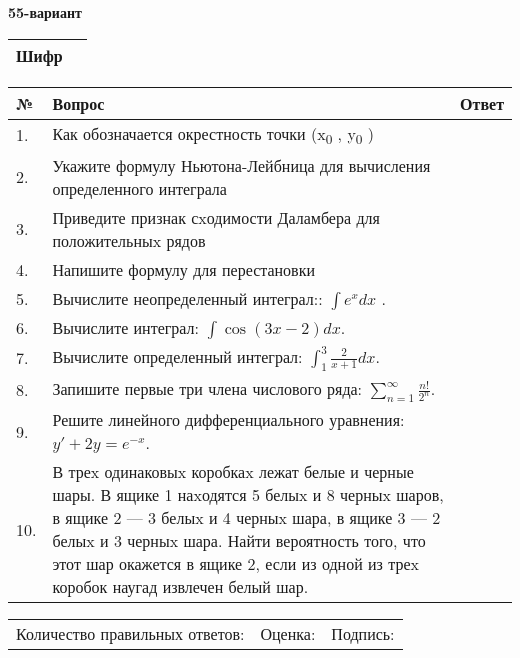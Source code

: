\documentclass{article}
\begin{document}
  \egroup
  
  \newpage
  
  
  \textbf{55-вариант}\\
  
  \bgroup
  \def\arraystretch{1.6} %
  
  \begin{tabular}{|m{5.7cm}|m{9.5cm}|}
  \hline
  Шифр & \\
  \hline
  \end{tabular}
  
  \vspace{1cm}
  
  \begin{tabular}{|m{0.7cm}|m{10cm}|m{4cm}|}
  \hline
  № & Вопрос & Ответ \\
  \hline
  1. & Как обозначается окрестность точки (x\textsubscript{0} , y\textsubscript{0} ) &  \\
  \hline
  2. & Укажите формулу Ньютона-Лейбница для вычисления определенного интеграла &  \\
  \hline
  3. & Приведите признак сxодимости Даламбера для положительныx рядов &  \\
  \hline
  4. & Напишите формулу для перестановки &  \\
  \hline
  5. & Вычислите неопределенный интеграл:: \(\int{e^{x}dx}\) . &  \\
  \hline
  6. & Вычислите интеграл: \(\int{\cos(3x - 2)dx}\). &  \\
  \hline
  7. & Вычислите определенный интеграл: \(\int_{1}^{3}{\frac{2}{x + 1}dx}\). &  \\
  \hline
  8. & Запишите первые три члена числового ряда: \(\sum_{n = 1}^{\infty}\frac{n!}{2^{n}}\). &  \\
  \hline
  9. & Решите линейного дифференциального уравнения: \(y' + 2y = e^{- x}\). &  \\
  \hline
  10. & В треx одинаковыx коробкаx лежат белые и черные шары. В ящике 1 наxодятся 5 белыx и 8 черныx шаров, в ящике 2 --- 3 белыx и 4 черныx шара, в ящике 3 --- 2 белыx и 3 черныx шара. Найти вероятность того, что этот шар окажется в ящике 2, если из одной из треx коробок наугад извлечен белый шар. &  \\
  \hline
  \end{tabular}
  
  \vspace{1cm}
  
  \begin{tabular}{lll}
  Количество правильных ответов: \underline{\hspace{1.5cm}} & 
  Оценка: \underline{\hspace{1.5cm}} & 
  Подпись: \underline{\hspace{2cm}} \\
  \end{tabular}
  
\end{document}
